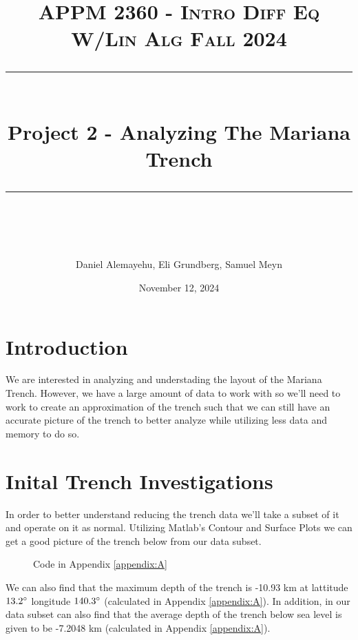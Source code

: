 \documentclass[letterpaper,12pt]{article}
\title{
\normalfont \normalsize 
\textsc{APPM 2360 - Intro Diff Eq W/Lin Alg \hfill Fall 2024} \\
[10pt] 
\rule{\linewidth}{0.5pt} \\[6pt] 
\huge Project 2 - Analyzing The Mariana Trench \\
\rule{\linewidth}{2pt}  \\[10pt]
}
\date{November 12, 2024}
\author{Daniel Alemayehu, Eli Grundberg, Samuel Meyn}
\begin{document}
\begin{titlingpage}
\maketitle
\end{titlingpage}
\newpage
\tableofcontents
\newpage
\section{Introduction}
We are interested in analyzing and understading the layout of the Mariana Trench. 
However, we have a large amount of data to work with so we'll need to work to create an approximation of the trench such that we can still have an accurate picture of the trench to better analyze while utilizing less data and memory to do so. 
\section{Inital Trench Investigations}
In order to better understand reducing the trench data we'll take a subset of it and operate on it as normal.
Utilizing Matlab's Contour and Surface Plots we can get a good picture of the trench below from our data subset.
\begin{figure}[H]
    \begin{adjustwidth}{-1in}{-1in}
    \centering
    \begin{subfigure}[b]{0.65\textwidth}
        \centering
        
        \label{fig:1a}
    \end{subfigure}
    \hfill
    \begin{subfigure}[b]{0.65\textwidth}
        \centering
        
        \label{fig:1b}
    \end{subfigure}
    \caption{Code in Appendix \ref{appendix:A}}
    \label{fig:1}
    \end{adjustwidth}
\end{figure}
We can also find that the maximum depth of the trench is -10.93 km at lattitude \(13.2\degree\) longitude \(140.3\degree\) (calculated in Appendix \ref{appendix:A}).
In addition, in our data subset can also find that the average depth of the trench below sea level is given to be -7.2048 km (calculated in Appendix \ref{appendix:A}).
\end{document}
